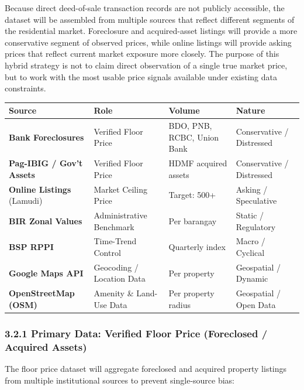 Because direct deed-of-sale transaction records are not publicly accessible, the dataset will be assembled from multiple sources that reflect different segments of the residential market. Foreclosure and acquired-asset listings will provide a more conservative segment of observed prices, while online listings will provide asking prices that reflect current market exposure more closely. The purpose of this hybrid strategy is not to claim direct observation of a single true market price, but to work with the most usable price signals available under existing data constraints.

\begin{center}
\begin{tabular}{p{} p{} p{} p{}}
\toprule
Source & Role & Volume & Nature \\
\midrule
\textbf{Bank Foreclosures} & Verified Floor Price & BDO, PNB, RCBC, Union Bank & Conservative / Distressed \\
\textbf{Pag-IBIG / Gov't Assets} & Verified Floor Price & HDMF acquired assets & Conservative / Distressed \\
\textbf{Online Listings} (Lamudi) & Market Ceiling Price & Target: 500+ & Asking / Speculative \\
\textbf{BIR Zonal Values} & Administrative Benchmark & Per barangay & Static / Regulatory \\
\textbf{BSP RPPI} & Time-Trend Control & Quarterly index & Macro / Cyclical \\
\textbf{Google Maps API} & Geocoding / Location Data & Per property & Geospatial / Dynamic \\
\textbf{OpenStreetMap (OSM)} & Amenity \& Land-Use Data & Per property radius & Geospatial / Open Data \\
\bottomrule
\end{tabular}
\end{center}

\subsubsection{\texorpdfstring{\textbf{3.2.1 Primary Data: Verified Floor Price (Foreclosed / Acquired Assets)}}{3.2.1 Primary Data: Verified Floor Price (Foreclosed / Acquired Assets)}}\label{primary-data-verified-floor-price-foreclosed-acquired-assets}

The floor price dataset will aggregate foreclosed and acquired property listings from multiple institutional sources to prevent single-source bias:

